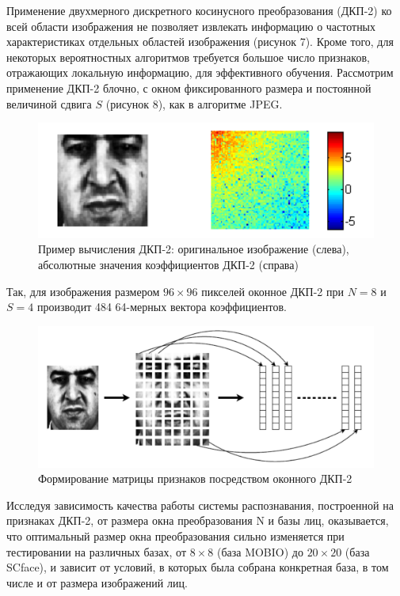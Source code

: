 Применение двухмерного дискретного косинусного преобразования (ДКП-2) ко всей области изображения не позволяет извлекать информацию о частотных характеристиках отдельных областей изображения (рисунок 7). Кроме того, для некоторых вероятностных алгоритмов требуется большое число признаков, отражающих локальную информацию, для эффективного обучения. Рассмотрим применение ДКП-2 блочно, с окном фиксированного размера и постоянной величиной сдвига $S$ (рисунок 8), как в алгоритме JPEG.

\begin{figure}[h!]
\centering
\includegraphics[scale=0.55]{res/pic007}
\caption{Пример вычисления ДКП-2: оригинальное изображение (слева), абсолютные значения коэффициентов ДКП-2 (справа)}
\end{figure}

Так, для изображения размером $96 \times 96$ пикселей оконное ДКП-2 при $N=8$ и $S=4$ производит 484 64-мерных вектора коэффициентов.

\begin{figure}[h!]
\centering
\includegraphics[scale=0.48]{res/pic008}
\caption{Формирование матрицы признаков посредством оконного ДКП-2}
\end{figure}

Исследуя зависимость качества работы системы распознавания, построенной на признаках ДКП-2, от размера окна преобразования N и базы лиц, оказывается, что оптимальный размер окна преобразования сильно изменяется при тестировании на различных базах, от $8 \times 8$ (база MOBIO) до $20 \times 20$ (база SCface), и зависит от условий, в которых была собрана конкретная база, в том числе и от размера изображений лиц.

